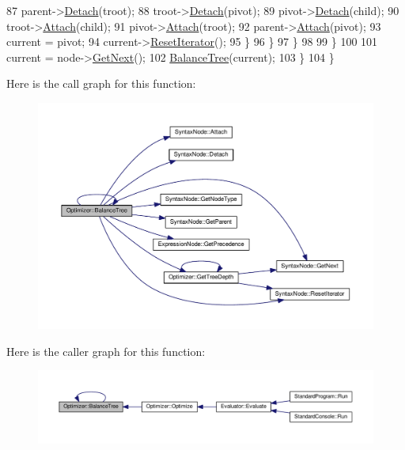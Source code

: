 \begin{DoxyCode}
87                         parent->\hyperlink{classSyntaxNode_ae57f629a5c5fa0994f036c105396da69}{Detach}(troot);
88                         troot->\hyperlink{classSyntaxNode_ae57f629a5c5fa0994f036c105396da69}{Detach}(pivot);
89                         pivot->\hyperlink{classSyntaxNode_ae57f629a5c5fa0994f036c105396da69}{Detach}(child);
90                         troot->\hyperlink{classSyntaxNode_af25fd5963125bb2d6b9a1864b9ff79c8}{Attach}(child);
91                         pivot->\hyperlink{classSyntaxNode_af25fd5963125bb2d6b9a1864b9ff79c8}{Attach}(troot);
92                         parent->\hyperlink{classSyntaxNode_af25fd5963125bb2d6b9a1864b9ff79c8}{Attach}(pivot);
93                         current = pivot;
94                         current->\hyperlink{classSyntaxNode_ac51307368fb255aa760b99e137178c89}{ResetIterator}();
95                     \}
96                 \}
97             \}
98 
99         \}
100 
101         current = node->\hyperlink{classSyntaxNode_af1fa46ba30aa4f2affa2d4e96a4be010}{GetNext}();
102         \hyperlink{classOptimizer_ad84621adb872b88ab7fdb3672064cfdb}{BalanceTree}(current);
103     \}
104 \}
\end{DoxyCode}


Here is the call graph for this function\+:
\nopagebreak
\begin{figure}[H]
\begin{center}
\leavevmode
\includegraphics[width=350pt]{d1/dc4/classOptimizer_ad84621adb872b88ab7fdb3672064cfdb_cgraph}
\end{center}
\end{figure}




Here is the caller graph for this function\+:
\nopagebreak
\begin{figure}[H]
\begin{center}
\leavevmode
\includegraphics[width=350pt]{d1/dc4/classOptimizer_ad84621adb872b88ab7fdb3672064cfdb_icgraph}
\end{center}
\end{figure}


